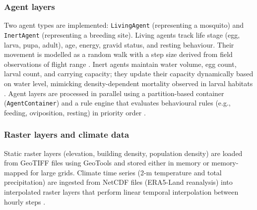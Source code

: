 \documentclass{article}
\begin{document}
\subsubsection{Agent layers}
Two agent types are implemented: \texttt{LivingAgent} (representing a mosquito) and \texttt{InertAgent} (representing a 
breeding site). Living agents track life stage (egg, larva, pupa, adult), age, energy, gravid status, and resting behaviour.
Their movement is modelled as a random walk with a step size derived from field observations of flight range \citep{1966.MA.FRL}. 
Inert agents maintain water volume, egg count, larval count, and carrying capacity; they update their capacity dynamically based on 
water level, mimicking density-dependent mortality observed in larval habitats \citep{2016.ST.OTI}. Agent layers are processed in 
parallel using a partition-based container (\texttt{AgentContainer}) and a rule engine that evaluates behavioural rules (e.g., 
feeding, oviposition, resting) in priority order \citep{2023.ST.ASR}.

\subsubsection{Raster layers and climate data}
Static raster layers (elevation, building density, population density) are loaded from GeoTIFF files using GeoTools and stored either 
in memory or memory-mapped for large grids. Climate time series (2-m temperature and total precipitation) are 
ingested from NetCDF files (ERA5-Land reanalysis) into interpolated raster layers that perform linear temporal interpolation between 
hourly steps \citep{2014.GC.AED, 2017.CL.IMS}.
\end{document}
